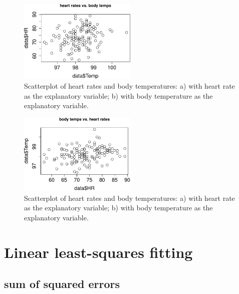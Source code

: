 \documentclass[
  letterpaper,
  DIV=11,
  numbers=noendperiod]{scrreprt}
\begin{document}
\begin{figure}[H]

{\centering \includegraphics[width=0.5\textwidth,height=\textheight]{./linreg_files/figure-pdf/HRTemp-scatter-1.pdf}

}

\caption{Scatterplot of heart rates and body temperatures: a) with heart
rate as the explanatory variable; b) with body temperature as the
explanatory variable.}

\end{figure}

\begin{figure}[H]

{\centering \includegraphics[width=0.5\textwidth,height=\textheight]{./linreg_files/figure-pdf/HRTemp-scatter-2.pdf}

}

\caption{Scatterplot of heart rates and body temperatures: a) with heart
rate as the explanatory variable; b) with body temperature as the
explanatory variable.}

\end{figure}

\hypertarget{linear-least-squares-fitting}{%
\section{Linear least-squares
fitting}\label{linear-least-squares-fitting}}

\label{sec:math8}

\hypertarget{sum-of-squared-errors}{%
\subsection{sum of squared errors}\label{sum-of-squared-errors}}
\end{document}
